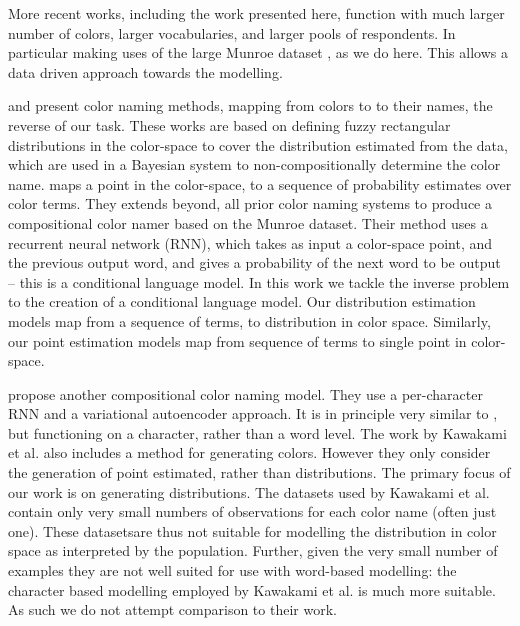 \documentclass[11pt,a4paper]{article}
\newcommand{\textcite}{\citet}
\begin{document}
More recent works, including the work presented here, function with much larger number of colors, larger vocabularies, and larger pools of respondents.
In particular making uses of the large Munroe dataset \textcite{Munroe2010XKCDdataset}, as we do here.
This allows a data driven approach towards the modelling.

\textcite{mcmahan2015bayesian} and \textcite{meomcmahanstone:color} present color naming methods, mapping from colors to to their names, the reverse of our task.
These works are based on defining fuzzy rectangular distributions in the color-space to cover the distribution estimated from the data, which are used in a Bayesian system to non-compositionally determine the color name.
%
%
\textcite{2016arXiv160603821M} maps a point in the color-space, to a sequence of probability estimates over color terms.
They extends beyond, all prior color naming systems to produce a compositional color namer based on the Munroe dataset.
Their method uses a recurrent neural network (RNN), which takes as input a color-space point, and the previous output word, and gives a probability of the next word to be output -- this is a conditional language model.
In this work we tackle the inverse problem to the creation of a conditional language model.
Our distribution estimation models map from a sequence of terms, to distribution in color space.
Similarly, our point estimation models map from sequence of terms to single point in color-space.



\textcite{DBLP:journals/corr/KawakamiDRS16} propose another compositional color naming model.
They use a per-character RNN and a variational autoencoder approach.
It is in principle very similar to \textcite{2016arXiv160603821M}, but functioning on a character, rather than a word level.
The work by Kawakami et al. also includes a method for generating colors.
However they only consider the generation of point estimated, rather than distributions.
The primary focus of our work is on generating distributions.
The datasets used by Kawakami et al. contain only very small numbers of observations for each color name (often just one).
These datasetsare thus not suitable for modelling the distribution in color space as interpreted by the population.
Further, given the very small number of examples they are not well suited for use with word-based modelling: the character based modelling employed by Kawakami et al. is much more suitable.
As such we do not attempt comparison to their work.
\end{document}
